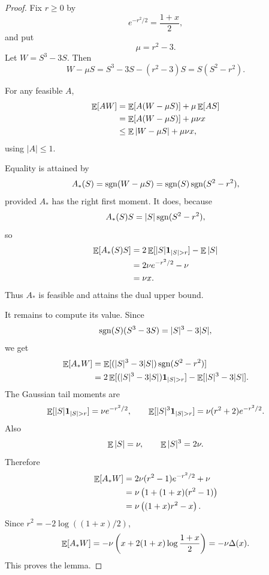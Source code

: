 \begin{proof}
Fix $r\ge0$ by
\[
        e^{-r^2/2}=\frac{1+x}{2},
\]
and put
\[
        \mu=r^2-3.
\]
Let $W=S^3-3S$. Then
\[
        W-\mu S=S^3-3S-(r^2-3)S=S(S^2-r^2).
\]

For any feasible $A$,
\begin{align*}
        \mathop{\mathbb{E}}[AW]
        &=\mathop{\mathbb{E}}[A(W-\mu S)]+\mu\mathop{\mathbb{E}}[AS]\\
        &=\mathop{\mathbb{E}}[A(W-\mu S)]+\mu\nu x\\
        &\le \mathop{\mathbb{E}}|W-\mu S|+\mu\nu x,
\end{align*}
using $|A|\le1$.

Equality is attained by
\[
        A_*(S)=\operatorname{sgn}(W-\mu S)=\operatorname{sgn}(S)\operatorname{sgn}(S^2-r^2),
\]
provided $A_*$ has the right first moment. It does, because
\[
        A_*(S)S=|S|\operatorname{sgn}(S^2-r^2),
\]
so
\begin{align*}
        \E[A_*(S)S]
        &=2\E[|S|\one_{|S|>r}]-\E|S|\\
        &=2\nu e^{-r^2/2}-\nu\\
        &=\nu x.
\end{align*}
Thus $A_*$ is feasible and attains the dual upper bound.

It remains to compute its value. Since
\[
        \operatorname{sgn}(S)(S^3-3S)=|S|^3-3|S|,
\]
we get
\begin{align*}
        \E[A_*W]
        &=\E[(|S|^3-3|S|)\sgn(S^2-r^2)]\\
        &=2\E[(|S|^3-3|S|)\one_{|S|>r}]
          -\E[|S|^3-3|S|].
\end{align*}
The Gaussian tail moments are
\[
        \E[|S|\one_{|S|>r}]=\nu e^{-r^2/2},
        \qquad
        \E[|S|^3\one_{|S|>r}]=\nu(r^2+2)e^{-r^2/2}.
\]
Also
\[
        \mathop{\mathbb{E}}|S|=\nu,
        \qquad
        \mathop{\mathbb{E}}|S|^3=2\nu.
\]
Therefore
\begin{align*}
        \mathop{\mathbb{E}}[A_*W]
        &=2\nu(r^2-1)e^{-r^2/2}+\nu\\
        &=\nu\left(1+(1+x)(r^2-1)\right)\\
        &=\nu\left((1+x)r^2-x\right).
\end{align*}
Since $r^2=-2\log((1+x)/2)$,
\[
        \mathop{\mathbb{E}}[A_*W]
        =-\nu\left(x+2(1+x)\log\frac{1+x}{2}\right)
        =-\nu\Delta(x).
\]
This proves the lemma.
\end{proof}



